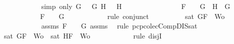 \begin{isabellebody}
\ \ \ \ \ \ \ \ \ \ \isamarkupfalse%
\ {\isacharparenleft}simp\ only{\isacharcolon}\ {\isacartoucheopen}G\ {\isacharequal}\ \isactrlbold {\isasymnot}\ G{}{\isacartoucheclose}\ {\isacartoucheopen}H\ {\isacharequal}\ \isactrlbold {\isasymnot}\ H{}{\isacartoucheclose}{\isacharparenright}\isanewline
\ \ \ \ \ \ \isamarkupfalse%
\isanewline
\ \ \ \ \ \ \ \ \isamarkupfalse%
\ {\isachardoublequoteopen}F\ {\isacharequal}\ \isactrlbold {\isasymnot}\ {\isacharparenleft}\isactrlbold {\isasymnot}\ G{\isacharparenright}\ {\isasymand}\ H\ {\isacharequal}\ G{\isachardoublequoteclose}\isanewline
\ \ \ \ \ \ \ \ \isamarkupfalse%
\ \isamarkupfalse%
\ {\isachardoublequoteopen}F\ {\isacharequal}\ \isactrlbold {\isasymnot}\ {\isacharparenleft}\isactrlbold {\isasymnot}\ G{\isacharparenright}{\isachardoublequoteclose}\isanewline
\ \ \ \ \ \ \ \ \ \ \isamarkupfalse%
\ {\isacharparenleft}rule\ conjunct{}{\isacharparenright}\isanewline
\ \ \ \ \ \ \ \ \isamarkupfalse%
\ {\isachardoublequoteopen}sat\ {\isacharparenleft}{\isacharbraceleft}G{\isacharcomma}F{\isacharbraceright}\ {\isasymunion}\ Wo{\isacharparenright}{\isachardoublequoteclose}\isanewline
\ \ \ \ \ \ \ \ \ \ \isamarkupfalse%
\ assms{\isacharparenleft}{}{\isacharparenright}\ {\isacartoucheopen}F\ {\isacharequal}\ \isactrlbold {\isasymnot}\ {\isacharparenleft}\isactrlbold {\isasymnot}\ G{\isacharparenright}{\isacartoucheclose}\ assms{\isacharparenleft}{}{\isacharcomma}{}{\isacharcomma}{}{\isacharparenright}\ \isamarkupfalse%
\ {\isacharparenleft}rule\ pcp{\isacharunderscore}colecComp{\isacharunderscore}DIS{\isacharunderscore}sat{}{\isacharparenright}\isanewline
\ \ \ \ \ \ \ \ \isamarkupfalse%
\ {\isachardoublequoteopen}sat\ {\isacharparenleft}{\isacharbraceleft}G{\isacharcomma}F{\isacharbraceright}\ {\isasymunion}\ Wo{\isacharparenright}\ {\isasymor}\ sat\ {\isacharparenleft}{\isacharbraceleft}H{\isacharcomma}F{\isacharbraceright}\ {\isasymunion}\ Wo{\isacharparenright}{\isachardoublequoteclose}\isanewline
\ \ \ \ \ \ \ \ \ \ \isamarkupfalse%
\ {\isacharparenleft}rule\ disjI{}{\isacharparenright}\isanewline
\ \ \ \ \ \ \isamarkupfalse%
\isanewline
\ \ \ \ \isamarkupfalse%
\isanewline
\ \ \isamarkupfalse%
\isanewline
{}\isamarkupfalse%
%
\endisatagproof
{\isafoldproof}%
%
\isadelimproof

\end{isabellebody}
